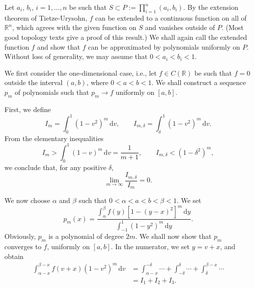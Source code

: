 \begin{Proof}Let $a_i$, $b_i$, $i=1,\ldots,n$ be such that $S\subset P:=\prod_{i=1}^n(a_i,b_i)$. By the extension theorem of Tietze-Urysohn, $f$ can be extended to a continuous function on all of $\mathbb{R}^n$, which agrees with the given function on $S$ and vanishes outside of $P$. (Most good topology texts give a proof of this result.) We shall again call the extended function $f$ and show that $f$ can be approximated by polynomials uniformly on $P$. Without loss of generality, we may assume that $0<a_i<b_i<1$.

We first consider the one-dimensional case, i.e., let $f\in C(\mathbb{R})$ be such that $f=0$ outside the interval $(a,b)$, where $0<a<b<1$. We shall construct a sequence $p_m$ of polynomials such that $p_m\to f$ uniformly on $[a,b]$.

First, we define
\begin{equation}\label{eq:weierstrass-kernel-integrals}
I_m=\int_0^1(1-v^2)^m\,\mathrm{d}v,\qquad I_{m,\delta}=\int_\delta^1(1-v^2)^m\,\mathrm{d}v.
\end{equation}
From the elementary inequalities
\begin{equation}\label{eq:weierstrass-kernel-integral-bounds}
I_m>\int_0^1(1-v)^m\,\mathrm{d}v=\dfrac1{m+1},\qquad I_{m,\delta}<(1-\delta^2)^m,
\end{equation}
we conclude that, for any positive $\delta$,
\begin{equation}\label{eq:weierstrass-kernel-tail-limit}
\lim_{m\to\infty}\dfrac{I_{m,\delta}}{I_m}=0.
\end{equation}


We now choose $\alpha$ and $\beta$ such that $0<\alpha<a<b<\beta<1$. We set
\begin{equation}\label{eq:weierstrass-one-dimensional-polynomial}
p_m(x)=\dfrac{\int_\alpha^\beta f(y)[1-(y-x)^2]^m\,\mathrm{d}y}{\int_{-1}^1(1-y^2)^m\,\mathrm{d}y}.
\end{equation}
Obviously, $p_m$ is a polynomial of degree $2m$. We shall now show that $p_m$ converges to $f$, uniformly on $[a,b]$. In the numerator, we set $y=v+x$, and obtain
\begin{equation}\label{eq:weierstrass-three-integral-split}
\begin{aligned}
\int_{\alpha-x}^{\beta-x}f(v+x)(1-v^2)^m\,\mathrm{d}v
&=\int_{\alpha-x}^{-\delta}\cdots+\int_{-\delta}^{\delta}\cdots+\int_\delta^{\beta-x}\cdots\\
&=I_1+I_2+I_3.
\end{aligned}
\end{equation}



\end{Proof}
